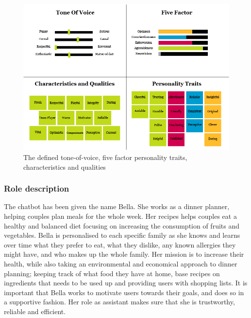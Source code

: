     \begin{figure}[h]
            \centering
            \includegraphics[scale=0.5]{figures/Defined_characteristics_and_traits.png}
            \caption{The defined tone-of-voice, five factor personality traits, characteristics and qualities}
            \label{fig:characteristics}
        \end{figure}
    
    \subsubsection{Role description}
    The chatbot has been given the name Bella. She works as a dinner planner, helping couples plan meals for the whole week. Her recipes helps couples eat a healthy and balanced diet focusing on increasing the consumption of fruits and vegetables. Bella is personalised to each specific family as she knows and learns over time what they prefer to eat, what they dislike, any known allergies they might have, and who makes up the whole family. Her mission is to increase their health, while also taking an environmental and economical approach to dinner planning; keeping track of what food they have at home, base recipes on ingredients that needs to be used up and providing users with shopping lists. It is important that Bella works to motivate users towards their goals, and does so in a supportive fashion. Her role as assistant makes sure that she is trustworthy, reliable and efficient.
    
